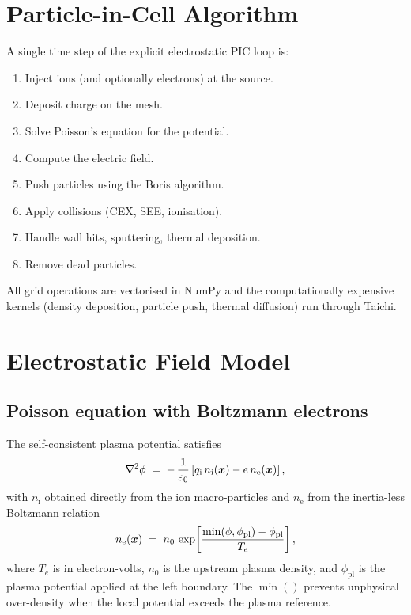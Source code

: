 \documentclass[11pt,a4paper]{article}
\begin{document}
\section{Particle-in-Cell Algorithm}

A single time step of the explicit electrostatic PIC loop is:
\begin{enumerate}[nosep]
    \item Inject ions (and optionally electrons) at the source.
    \item Deposit charge on the mesh.
    \item Solve Poisson's equation for the potential.
    \item Compute the electric field.
    \item Push particles using the Boris algorithm.
    \item Apply collisions (CEX, SEE, ionisation).
    \item Handle wall hits, sputtering, thermal deposition.
    \item Remove dead particles.
\end{enumerate}
All grid operations are vectorised in NumPy and the computationally
expensive kernels (density deposition, particle push, thermal
diffusion) run through Taichi.

\section{Electrostatic Field Model}

\subsection{Poisson equation with Boltzmann electrons}

The self-consistent plasma potential satisfies
\begin{equation}
    \nabla^{2}\phi \;=\; -\,\frac{1}{\varepsilon_{0}}
        \left[ q_{\mathrm{i}}\,n_{\mathrm{i}}(\vb*{x})
             - e\,n_{\mathrm{e}}(\vb*{x}) \right],
    \label{eq:poisson}
\end{equation}
with \(n_{\mathrm i}\) obtained directly from the ion macro-particles
and \(n_{\mathrm e}\) from the inertia-less Boltzmann relation
\begin{equation}
    n_{\mathrm{e}}(\vb*{x}) \;=\; n_{0}\,
    \exp\!\left[\frac{\min(\phi,\phi_{\mathrm{pl}})-\phi_{\mathrm{pl}}}{T_{e}}\right],
    \label{eq:boltzmann}
\end{equation}
where \(T_{e}\) is in electron-volts, \(n_{0}\) is the upstream plasma
density, and \(\phi_{\mathrm{pl}}\) is the plasma potential applied at the
left boundary.  The \(\min()\) prevents unphysical over-density when the
local potential exceeds the plasma reference.
\end{document}
